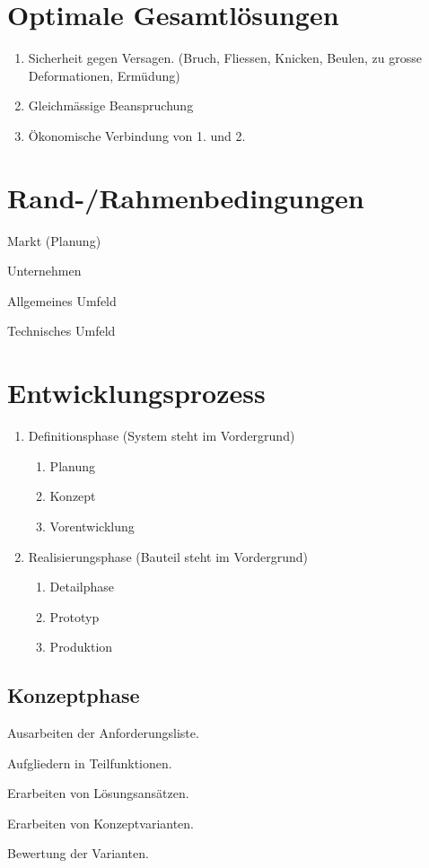 
\section{Optimale Gesamtlösungen} %
	\begin{enumerate}
		\item Sicherheit gegen Versagen. (Bruch, Fliessen, Knicken, Beulen, zu grosse Deformationen, Ermüdung)
		\item Gleichmässige Beanspruchung
		\item Ökonomische Verbindung von 1. und 2.
	\end{enumerate}
\section{Rand-/Rahmenbedingungen} %
	\begin{tightitemize}
		\item Markt (Planung)
		\item Unternehmen
		\item Allgemeines Umfeld
		\item Technisches Umfeld
	\end{tightitemize}
\section{Entwicklungsprozess} %
	\begin{enumerate}
		\item Definitionsphase (System steht im Vordergrund)
			\begin{enumerate}
			\item Planung
			\item Konzept
			\item Vorentwicklung
			\end{enumerate}
		\item Realisierungsphase (Bauteil steht im Vordergrund)
			\begin{enumerate}
			\item Detailphase
			\item Prototyp
			\item Produktion
			\end{enumerate}
	\end{enumerate}
	
	\subsection{Konzeptphase} %
		\begin{tightitemize}
			\item Ausarbeiten der Anforderungsliste.
			\item Aufgliedern in Teilfunktionen.
			\item Erarbeiten von Lösungsansätzen.
			\item Erarbeiten von Konzeptvarianten.
			\item Bewertung der Varianten.
		\end{tightitemize}
